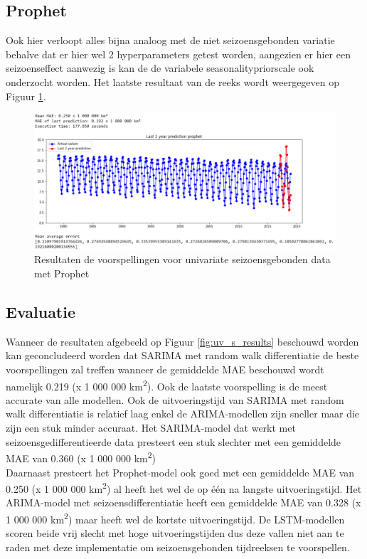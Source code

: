 \clearpage
\subsection{Prophet}

Ook hier verloopt alles bijna analoog met de niet seizoensgebonden variatie behalve dat er hier wel 2 hyperparameters getest worden, aangezien er hier een seizoenseffect aanwezig is kan de de variabele seasonality\textunderscore prior\textunderscore scale ook onderzocht worden. Het laatste resultaat van de reeks wordt weergegeven op Figuur \ref{fig:uvsprophet}.

\begin{figure}[!h]
    \centering
    \caption{Resultaten de voorspellingen voor univariate seizoensgebonden data met Prophet}
    \label{fig:uvsprophet}
    \includegraphics[width=1\linewidth]{uv_s_prophet}
\end{figure}

\clearpage
\subsection{Evaluatie}

Wanneer de resultaten afgebeeld op Figuur \ref{fig:uv_s_results} beschouwd worden kan geconcludeerd worden dat SARIMA met random walk differentiatie de beste voorspellingen zal treffen wanneer de gemiddelde MAE beschouwd wordt namelijk 0.219 (x 1 000 000 km\textsuperscript{2}). Ook de laatste voorspelling is de meest accurate van alle modellen. Ook de uitvoeringstijd van SARIMA met random walk differentiatie is relatief laag enkel de ARIMA-modellen zijn sneller maar die zijn een stuk minder accuraat.
Het SARIMA-model dat werkt met seizoensgedifferentieerde data presteert een stuk slechter met een gemiddelde MAE van 0.360 (x 1 000 000 km\textsuperscript{2})
\\

Daarnaast presteert het Prophet-model ook goed met een gemiddelde MAE van 0.250 (x 1 000 000 km\textsuperscript{2}) al heeft het wel de op \'{e}\'{e}n na langste uitvoeringstijd. Het ARIMA-model met seizoensdifferentiatie heeft een gemiddelde MAE van 0.328 (x 1 000 000 km\textsuperscript{2}) maar heeft wel de kortste uitvoeringstijd.
De LSTM-modellen scoren beide vrij slecht met hoge uitvoeringstijden dus deze vallen niet aan te raden met deze implementatie om seizoensgebonden tijdreeksen te voorspellen.
\\

